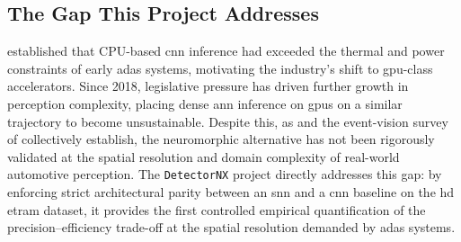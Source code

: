 \subsection{The Gap This Project Addresses}

\textcite{lin_adas_cnn_issues} established that CPU-based \gls{cnn} inference had exceeded the thermal and power constraints of early \gls{adas} systems, motivating the industry's shift to \gls{gpu}-class accelerators.
Since 2018, legislative pressure has driven further growth in perception complexity, placing dense \gls{ann} inference on \glspl{gpu} on a similar trajectory to become unsustainable.
Despite this, as \textcite{pfeiffer_snn_opportunities} and the event-vision survey of \textcite{gallego2020event} collectively establish, the neuromorphic alternative has not been rigorously validated at the spatial resolution and domain complexity of real-world automotive perception.
The \texttt{DetectorNX} project directly addresses this gap: by enforcing strict architectural parity between an \gls{snn} and a \gls{cnn} baseline on the \gls{hd} \gls{etram} dataset, it provides the first controlled empirical quantification of the precision--efficiency trade-off at the spatial resolution demanded by \gls{adas} systems.
